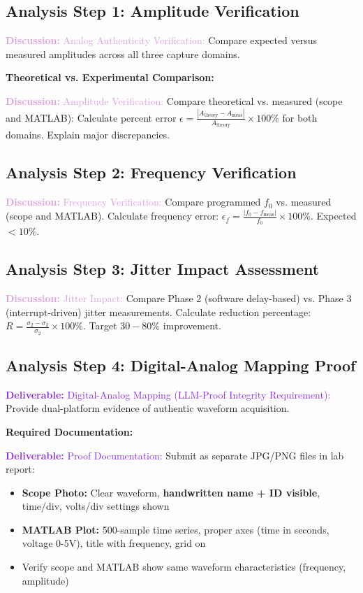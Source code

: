 \documentclass[11pt,letterpaper]{article}
\providecommand{\disECE}[1]{\textcolor{Plum}{\textbf{Discussion:} #1}}
\providecommand{\delECE}[1]{\textcolor{BlueViolet}{\textbf{Deliverable:} #1}}
\begin{document}
\subsection{Analysis Step 1: Amplitude Verification}
\disECE{Analog Authenticity Verification:} Compare expected versus measured amplitudes across all three capture domains.

\textbf{Theoretical vs. Experimental Comparison:}



\disECE{Amplitude Verification:} Compare theoretical vs. measured (scope and MATLAB): Calculate percent error $\epsilon = \frac{|A_{\text{theory}} - A_{\text{meas}}|}{A_{\text{theory}}} \times 100\%$ for both domains. Explain major discrepancies.

\subsection{Analysis Step 2: Frequency Verification}

\disECE{Frequency Verification:} Compare programmed $f_0$ vs. measured (scope and MATLAB). Calculate frequency error: $\epsilon_f = \frac{|f_0 - f_{\text{meas}}|}{f_0} \times 100\%$. Expected $< 10\%$.

\subsection{Analysis Step 3: Jitter Impact Assessment}
\disECE{Jitter Impact:} Compare Phase 2 (software delay-based) vs. Phase 3 (interrupt-driven) jitter measurements. Calculate reduction percentage: $R = \frac{\sigma_2 - \sigma_3}{\sigma_2} \times 100\%$. Target $30-80\%$ improvement.

\subsection{Analysis Step 4: Digital-Analog Mapping Proof}
\delECE{Digital-Analog Mapping (LLM-Proof Integrity Requirement):} Provide dual-platform evidence of authentic waveform acquisition.

\textbf{Required Documentation:}


\delECE{Proof Documentation:} Submit as separate JPG/PNG files in lab report:
\begin{itemize}
    \item \textbf{Scope Photo:} Clear waveform, \textbf{handwritten name + ID visible}, time/div, volts/div settings shown
    \item \textbf{MATLAB Plot:} 500-sample time series, proper axes (time in seconds, voltage 0-5V), title with frequency, grid on
    \item Verify scope and MATLAB show same waveform characteristics (frequency, amplitude)
\end{itemize}
\end{document}
